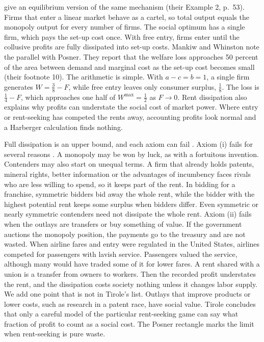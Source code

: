 \citet{MankiwWhinston1986} give an equilibrium version of the same mechanism (their Example 2, p.~53). Firms that
enter a linear market behave as a cartel, so total output equals the monopoly output for every number of firms.
The social optimum has a single firm, which pays the set-up cost once. With free entry, firms enter until the
collusive profits are fully dissipated into set-up costs. Mankiw and Whinston note the parallel with Posner. They
report that the welfare loss approaches 50 percent of the area between demand and marginal cost as the set-up cost
becomes small (their footnote 10). The arithmetic is simple. With $a - c = b = 1$, a single firm generates
$W = \frac{3}{8} - F$, while free entry leaves only consumer surplus, $\frac{1}{8}$. The loss is
$\frac{1}{4} - F$, which approaches one half of $W^{\max} = \frac{1}{2}$ as $F \to 0$. Rent dissipation also
explains why profits can understate the social cost of market power. Where entry or rent-seeking has competed the
rents away, accounting profits look normal and a Harberger calculation finds nothing.

Full dissipation is an upper bound, and each axiom can fail \citep[sec.~1.3]{Tirole1988}. Axiom (i) fails for
several reasons \citep{Fisher1985}. A monopoly may be won by luck, as with a fortuitous invention. Contenders may
also start on unequal terms. A firm that already holds patents, mineral rights, better information or the advantages
of incumbency faces rivals who are less willing to spend, so it keeps part of the rent. In bidding for a franchise,
symmetric bidders bid away the whole rent, while the bidder with the highest potential rent keeps some surplus when
bidders differ. Even symmetric or nearly symmetric contenders need not dissipate the whole rent. Axiom (ii) fails
when the outlays are transfers or buy something of value. If the government auctions the monopoly position, the payments go to the treasury and are not wasted. When airline fares and entry
were regulated in the United States, airlines competed for passengers with lavish service. Passengers valued the
service, although many would have traded some of it for lower fares. A rent shared with a union is a transfer from
owners to workers. Then the recorded profit understates the rent, and the dissipation costs society nothing unless
it changes labor supply. We add one point that is not in Tirole's list. Outlays that improve products or lower
costs, such as research in a patent race, have social value. Tirole concludes that only a careful model of the
particular rent-seeking game can say what fraction of profit to count as a social cost. The Posner rectangle
marks the limit when rent-seeking is pure waste.

